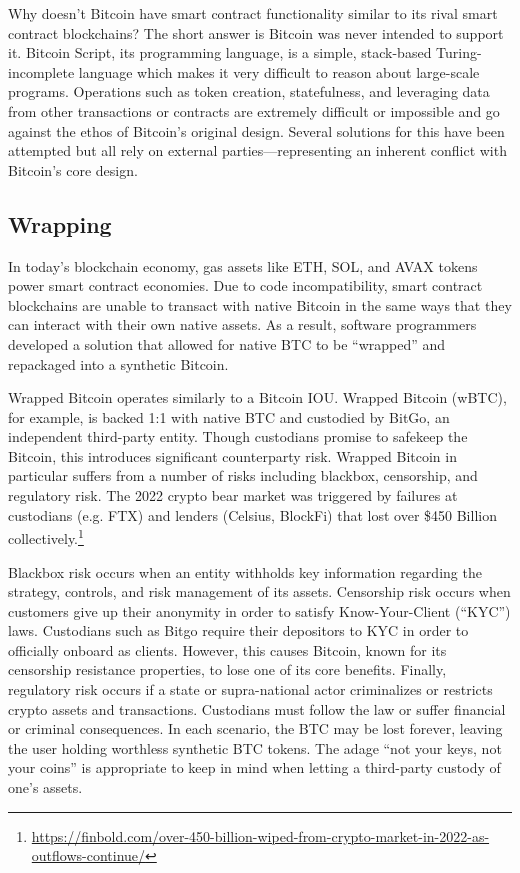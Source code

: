 \documentclass[twoside, a4paper, 11pt]{article}
\begin{document}
  Why doesn’t Bitcoin have smart contract functionality similar to its rival smart contract blockchains? The short answer is Bitcoin was never intended to support it. Bitcoin Script, its programming language, is a simple, stack-based Turing-incomplete language which makes it very difficult to reason about large-scale programs. Operations such as token creation, statefulness, and leveraging data from other transactions or contracts are extremely difficult or impossible and go against the ethos of Bitcoin’s original design. Several solutions for this have been attempted but all rely on external parties—representing an inherent conflict with Bitcoin’s core design.

  \subsection{Wrapping}

  In today’s blockchain economy, gas assets like ETH, SOL, and AVAX tokens power smart contract economies. Due to code incompatibility, smart contract blockchains are unable to transact with native Bitcoin in the same ways that they can interact with their own native assets. As a result, software programmers developed a solution that allowed for native BTC to be “wrapped” and repackaged into a synthetic Bitcoin.

  Wrapped Bitcoin operates similarly to a Bitcoin IOU. Wrapped Bitcoin (wBTC), for example, is backed 1:1 with native BTC and custodied by BitGo, an independent third-party entity. Though custodians promise to safekeep the Bitcoin, this introduces significant counterparty risk. Wrapped Bitcoin in particular suffers from a number of risks including blackbox, censorship, and regulatory risk. The 2022 crypto bear market was triggered by failures at custodians (e.g. FTX) and lenders (Celsius, BlockFi) that lost over \$450 Billion collectively.\footnote{\url{https://finbold.com/over-450-billion-wiped-from-crypto-market-in-2022-as-outflows-continue/}}

  Blackbox risk occurs when an entity withholds key information regarding the strategy, controls, and risk management of its assets. Censorship risk occurs when customers give up their anonymity in order to satisfy Know-Your-Client (“KYC”) laws. Custodians such as Bitgo require their depositors to KYC in order to officially onboard as clients. However, this causes Bitcoin, known for its censorship resistance properties, to lose one of its core benefits. Finally, regulatory risk occurs if a state or supra-national actor criminalizes or restricts crypto assets and transactions. Custodians must follow the law or suffer financial or criminal consequences. In each scenario, the BTC may be lost forever, leaving the user holding worthless synthetic BTC tokens. The adage “not your keys, not your coins” is appropriate to keep in mind when letting a third-party custody of one’s assets.
\end{document}
